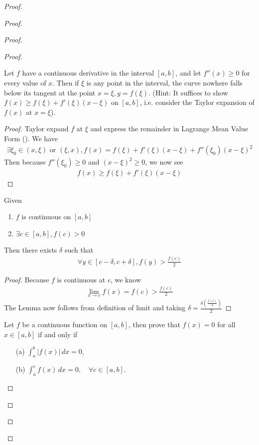 \documentclass{report}
\begin{document}
\begin{proof}
\begin{proof}
\begin{proof}
\begin{proof}
\begin{question}{}{}
Let \( f \) have a continuous derivative in the interval \( [a,b] \), and let \( f''(x) \geq 0 \) for every value of \( x \). Then if \( \xi \) is any point in the interval, the curve nowhere falls below its tangent at the point \( x = \xi, y = f(\xi) \). (Hint: It suffices to show \( f(x) \geq f(\xi) + f'(\xi)(x - \xi) \) on \( [a,b] \), i.e. consider the Taylor expansion of \( f(x) \) at \( x = \xi \)).
\end{question}
\begin{proof}
Taylor expand $f$ at $\xi$ and express the remainder in Lagrange Mean Value Form (). We have 
\begin{align*}
\exists \xi_0\in (x,\xi)\text{ or }(\xi,x), f(x)=f(\xi)+f'(\xi)(x-\xi)+f''(\xi_0)(x-\xi)^2
\end{align*}
Then because $f''(\xi_0)\geq 0$ and $(x-\xi)^2\geq 0$, we now see 
\begin{align*}
f(x)\geq f(\xi)+f'(\xi)(x-\xi)
\end{align*}
\end{proof}
\begin{lemma}
\label{8.7.1}
Given 
\begin{enumerate}[label=(\alph*)]
  \item $f$ is continuous on $[a,b]$ 
  \item $\exists c\in [a,b], f(c)>0$ 
\end{enumerate}
Then there exists $\delta $ such that 
\begin{align*}
\forall y \in [c-\delta ,c+\delta ], f(y)>\frac{f(c)}{2}
\end{align*}
\end{lemma}
\begin{proof}
Because $f$ is continuous at $c$,  we know 
\begin{align*}
\lim_{x \to c} f(x)=f(c)>\frac{f(c)}{2}
\end{align*}
The Lemma now follows from definition of limit and taking $\delta=\frac{\delta (\frac{f(c)}{4})}{2}$
\end{proof}
\begin{question}{}{}
Let \( f \) be a continuous function on \( [a, b] \), then prove that \( f(x) = 0 \) for all \( x \in [a, b] \) if and only if 
\begin{enumerate}
\item[(a)] \(\int_{a}^{b} |f(x)| \, dx = 0\),
\item[(b)] \(\int_{a}^{c} f(x) \, dx = 0, \quad \forall c \in [a, b]\).
\end{enumerate}

\end{question}
\end{proof}
\end{proof}
\end{proof}
\end{proof}
\end{document}
